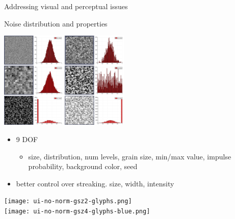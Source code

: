 \documentclass[notes]{beamer}
\begin{document}
\begin{frame}{Addressing visual and perceptual issues}
    \vspace{-0.1in}
    \begin{beamerboxesrounded}{Noise distribution and properties}
    \begin{minipage}{0.6\linewidth}
      \begin{center}
      \includegraphics[width=2.45in]{noises.png}
      \end{center}
      \footnotesize
      \vspace{-0.1in}
      \begin{itemize}
        \item 9 DOF 
        \begin{itemize}
        \item size, distribution, num levels, grain size, min/max value, impulse probability, background color, seed
        \end{itemize}
        \item better control over streaking. size, width, intensity
      \end{itemize}
      \end{minipage}
    \begin{minipage}{0.35\linewidth}
       \begin{center}
       \texttt{[image: ui-no-norm-gsz2-glyphs.png]}\\
       \texttt{[image: ui-no-norm-gsz4-glyphs-blue.png]}
       \end{center}
     \end{minipage}
    \end{beamerboxesrounded}
\end{frame}
\end{document}
